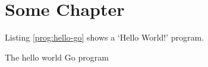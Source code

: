 \documentclass{report}
\begin{document}
\chapter{Some Chapter}

Listing \ref{prog:hello-go} shows a ‘Hello World!’ program.

\begin{program}
	\caption{The hello world Go program\label{prog:hello-go}}
\end{program}

\appendix

\end{document}
